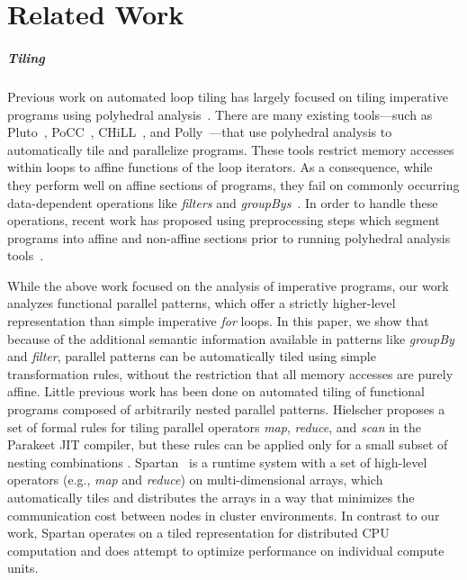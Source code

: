 \chapter{Related Work}
\label{related}


\paragraph{Tiling}
Previous work on automated loop tiling has largely focused on tiling imperative programs
using polyhedral analysis~\cite{bondhugula08,pouchet10phd}.
There are many existing tools---such as Pluto~\cite{pluto08pldi},
PoCC~\cite{pouchet11popl}, CHiLL~\cite{chen2008chill},
and Polly~\cite{grosser2012polly}---that use polyhedral analysis
to automatically tile and parallelize programs.  These tools restrict memory
accesses within loops to affine functions of the loop iterators.
As a consequence, while they perform well on affine sections of programs,
they fail on commonly occurring data-dependent operations
like \emph{filters} and \emph{groupBys}~\cite{benabderrahmane10cc}. In order to handle these operations,
recent work has proposed using preprocessing steps which segment programs into affine
and non-affine sections prior to running polyhedral analysis tools~\cite{venkat}.

While the above work focused on the analysis of imperative programs, our work
analyzes functional parallel patterns, which offer a strictly higher-level representation
than simple imperative \emph{for} loops.
In this paper, we show that because of the additional semantic information
available in patterns like \emph{groupBy} and \emph{filter},
parallel patterns can be automatically tiled using
simple transformation rules, without the restriction that all memory accesses
are purely affine.
Little previous work has been done on automated tiling of functional
programs composed of arbitrarily nested parallel patterns.
Hielscher proposes a set of formal rules for tiling parallel operators \emph{map}, \emph{reduce}, and \emph{scan}
in the Parakeet JIT compiler, but these rules can be applied only for a small subset of nesting combinations \cite{parakeet}.
Spartan~\cite{spartan} is a runtime system with a set of high-level operators
(e.g., \emph{map} and \emph{reduce}) on multi-dimensional arrays, which
automatically tiles and distributes the arrays in a way that minimizes the
communication cost between nodes in cluster environments. In contrast to
our work, Spartan
operates on a tiled representation for distributed CPU computation and does attempt to optimize
performance on individual compute units.

